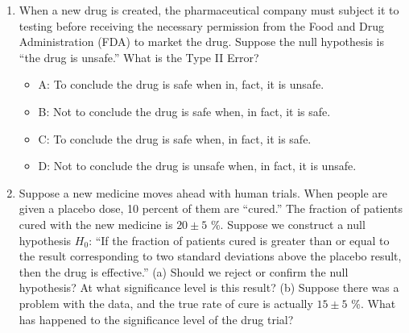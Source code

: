 \documentclass{article}
\begin{document}
\begin{enumerate}
\item When a new drug is created, the pharmaceutical company must subject it to testing before receiving the necessary
permission from the Food and Drug Administration (FDA) to market the drug. Suppose the null hypothesis is “the drug is
unsafe.” What is the Type II Error?
\begin{itemize}
\item A: To conclude the drug is safe when in, fact, it is unsafe.
\item B: Not to conclude the drug is safe when, in fact, it is safe.
\item C: To conclude the drug is safe when, in fact, it is safe.
\item D: Not to conclude the drug is unsafe when, in fact, it is unsafe.
\end{itemize}
\item Suppose a new medicine moves ahead with human trials.  When people are given a placebo dose, 10 percent of them are ``cured.''  The fraction of patients cured with the new medicine is $20 \pm 5$ \%.  Suppose we construct a null hypothesis $H_0$: ``If the fraction of patients cured is greater than or equal to the result corresponding to two standard deviations above the placebo result, then the drug is effective.''  (a) Should we reject or confirm the null hypothesis?  At what significance level is this result? (b) Suppose there was a problem with the data, and the true rate of cure is actually $15 \pm 5$ \%.  What has happened to the significance level of the drug trial?
\end{enumerate}
\end{document}
